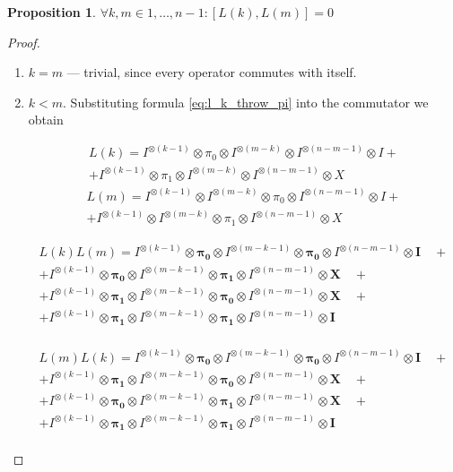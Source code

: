 \documentclass[a4paper, openany, 12pt]{article}
\newtheorem{prop}{Proposition}
\theoremstyle{remark}
\theoremstyle{definition}
\newcommand{\ot}{\otimes}
\begin{document}
\begin{prop}{$\forall k,m \in {1,\dots,n-1}: [L(k),L(m)] = 0$\label{prop:L_commut}}
\end{prop}
\begin{proof}

\begin{enumerate}
\item $k=m$ — trivial, since every operator commutes with itself.
\item $k < m$.
   Substituting formula \eqref{eq:l_k_throw_pi} into the commutator we obtain

\begin{multline}
    L(k) = I^{\ot (k-1)} \ot \pi_0\ot I^{\ot (m-k)}\ot I^{\ot (n-m-1)}\ot I + \\
       + I^{\ot (k-1)} \ot \pi_1\ot I^{\ot (m-k)}\ot I^{\ot (n-m-1)}\ot X 
\end{multline}
\begin{multline}
    L(m) = I^{\ot (k-1)} \ot I^{\ot (m-k)}\ot \pi_0\ot I^{\ot (n-m-1)}\ot I + \\
       + I^{\ot (k-1)} \ot I^{\ot (m-k)}\ot \pi_1\ot I^{\ot (n-m-1)}\ot X 
\end{multline}

\begin{multline}
L(k)L(m) = 
I^{\ot(k-1)} \ot \boldsymbol{\pi_0} \ot I^{\ot(m-k-1)} \ot \boldsymbol{\pi_0} \ot I^{\ot(n-m-1)} \ot \boldsymbol{I} \quad + \\
+ I^{\ot(k-1)} \ot \boldsymbol{\pi_0} \ot I^{\ot(m-k-1)} \ot \boldsymbol{\pi_1} \ot I^{\ot(n-m-1)} \ot \boldsymbol{X} \quad + \\
+ I^{\ot(k-1)} \ot \boldsymbol{\pi_1} \ot I^{\ot(m-k-1)} \ot \boldsymbol{\pi_0} \ot I^{\ot(n-m-1)} \ot \boldsymbol{X} \quad + \\
+ I^{\ot(k-1)} \ot \boldsymbol{\pi_1} \ot I^{\ot(m-k-1)} \ot \boldsymbol{\pi_1} \ot I^{\ot(n-m-1)} \ot \boldsymbol{I} \quad\\
\end{multline}

\begin{multline}
L(m)L(k) = 
I^{\ot(k-1)} \ot \boldsymbol{\pi_0} \ot I^{\ot(m-k-1)} \ot \boldsymbol{\pi_0} \ot I^{\ot(n-m-1)} \ot \boldsymbol{I} \quad + \\
+ I^{\ot(k-1)} \ot \boldsymbol{\pi_1} \ot I^{\ot(m-k-1)} \ot \boldsymbol{\pi_0} \ot I^{\ot(n-m-1)} \ot \boldsymbol{X} \quad + \\
+ I^{\ot(k-1)} \ot \boldsymbol{\pi_0} \ot I^{\ot(m-k-1)} \ot \boldsymbol{\pi_1} \ot I^{\ot(n-m-1)} \ot \boldsymbol{X} \quad + \\
+ I^{\ot(k-1)} \ot \boldsymbol{\pi_1} \ot I^{\ot(m-k-1)} \ot \boldsymbol{\pi_1} \ot I^{\ot(n-m-1)} \ot \boldsymbol{I} \quad\\
\end{multline}


\end{enumerate}
\end{proof}
\end{document}
